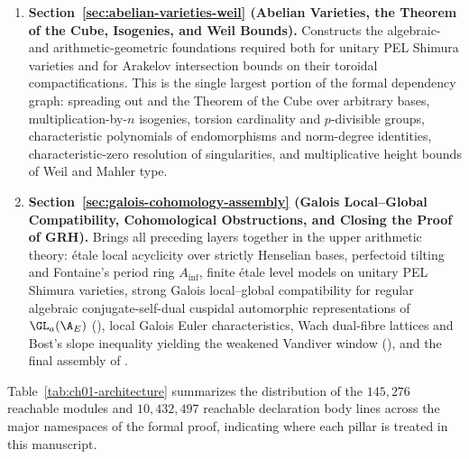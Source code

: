 \begin{enumerate}
  \item \textbf{Section~\ref{sec:abelian-varieties-weil} (Abelian Varieties,
  the Theorem of the Cube, Isogenies, and Weil Bounds).}
  Constructs the algebraic- and arithmetic-geometric foundations required both
  for unitary PEL Shimura varieties and for Arakelov intersection bounds on
  their toroidal compactifications.
  This is the single largest portion of the formal dependency graph: spreading
  out and the Theorem of the Cube over arbitrary bases, multiplication-by-$n$
  isogenies, torsion cardinality and $p$-divisible groups, characteristic
  polynomials of endomorphisms and norm-degree identities, characteristic-zero
  resolution of singularities, and multiplicative height bounds of Weil and
  Mahler type.

  \item \textbf{Section~\ref{sec:galois-cohomology-assembly} (Galois
  Local--Global Compatibility, Cohomological Obstructions, and Closing the
  Proof of GRH).}
  Brings all preceding layers together in the upper arithmetic theory:
  \'etale local acyclicity over strictly Henselian bases, perfectoid tilting
  and Fontaine's period ring $A_{\mathrm{inf}}$, finite \'etale level models on
  unitary PEL Shimura varieties, strong Galois local--global compatibility for
  regular algebraic conjugate-self-dual cuspidal automorphic representations of
  $\GL_a(\A_E)$ (),
  local Galois Euler characteristics, Wach dual-fibre lattices and Bost's slope
  inequality yielding the weakened Vandiver window
  (), and the final assembly of
  .
\end{enumerate}

Table~\ref{tab:ch01-architecture} summarizes the distribution of the
$145{,}276$ reachable modules and $10{,}432{,}497$ reachable declaration body
lines across the major namespaces of the formal proof, indicating where each
pillar is treated in this manuscript.

